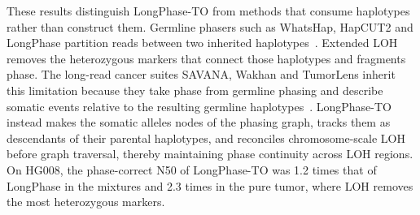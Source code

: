 \documentclass[unnumsec,webpdf,contemporary,large]{oup-authoring-template}
\begin{document}
These results distinguish LongPhase-TO from methods that consume haplotypes rather than construct them. Germline phasers such as WhatsHap, HapCUT2 and LongPhase partition reads between two inherited haplotypes~\cite{martin2016,edge2017,lin2022}. Extended LOH removes the heterozygous markers that connect those haplotypes and fragments phase. The long-read cancer suites SAVANA, Wakhan and TumorLens inherit this limitation because they take phase from germline phasing and describe somatic events relative to the resulting germline haplotypes~\cite{elrick2025,ahmad2025,paulin2026}. LongPhase-TO instead makes the somatic alleles nodes of the phasing graph, tracks them as descendants of their parental haplotypes, and reconciles chromosome-scale LOH before graph traversal, thereby maintaining phase continuity across LOH regions. On HG008, the phase-correct N50 of LongPhase-TO was 1.2 times that of LongPhase in the mixtures and 2.3 times in the pure tumor, where LOH removes the most heterozygous markers.
\end{document}
